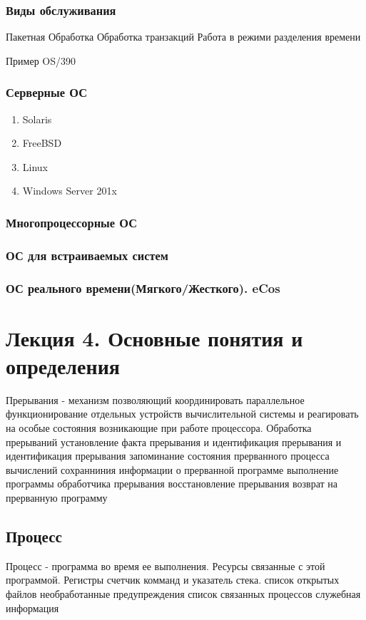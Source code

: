 \documentclass[a4paper]{article}
\begin{document}
\subsubsection{Виды обслуживания}
Пакетная Обработка
Обработка транзакций
Работа в режими разделения времени

Пример OS/390


\subsubsection{Серверные ОС}
\begin{enumerate}
\item Solaris
\item FreeBSD
\item Linux
\item Windows Server 201x
\end{enumerate}

\subsubsection{Многопроцессорные ОС}
\subsubsection{ОС для встраиваемых систем}
\subsubsection{ОС реального времени(Мягкого/Жесткого). eCos}


\section{Лекция 4. Основные понятия и определения}
Прерывания - механизм позволяющий координировать параллельное функционирование отдельных устройств вычислительной системы и реагировать на особые состояния возникающие при работе процессора. 
Обработка прерываний
    установление факта прерывания и идентификация прерывания
    и идентификация прерывания
    запоминание состояния прерванного процесса вычислений
    сохранниния информации о прерванной программе
    выполнение программы обработчика прерывания
    восстановление прерывания
    возврат на прерванную программу

\subsection{Процесс}
Процесс - программа во время ее выполнения. 
    Ресурсы связанные с этой программой. Регистры счетчик комманд и указатель стека.
    список открытых файлов
    необработанные предупреждения
    список связанных процессов
    служебная информация
\end{document}
